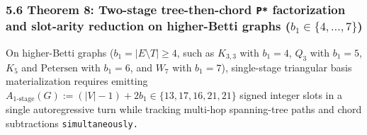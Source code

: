 \documentclass[
  11pt,
]{article}
\begin{document}
\subsubsection{\texorpdfstring{5.6 Theorem 8: Two-stage tree-then-chord
\texttt{P*} factorization and slot-arity reduction on higher-Betti
graphs
(\(b_1 \in \{4,\allowbreak  \dots,\allowbreak  7\}\))}{5.6 Theorem 8: Two-stage tree-then-chord P* factorization and slot-arity reduction on higher-Betti graphs (b\_1 \textbackslash in \textbackslash\{4,\textbackslash allowbreak  \textbackslash dots,\textbackslash allowbreak  7\textbackslash\})}}\label{theorem-8-two-stage-tree-then-chord-p-factorization-and-slot-arity-reduction-on-higher-betti-graphs-b_1-in-4-dots-7}

On higher-Betti graphs (\(b_1 = |E \setminus T| \ge 4\), such as
\(K_{3,\allowbreak 3}\) with \(b_1 = 4\), \(Q_3\) with \(b_1 = 5\),
\(K_5\) and \(\text{Petersen}\) with \(b_1 = 6\), and \(W_7\) with
\(b_1 = 7\)), single-stage triangular basis materialization requires
emitting
\(A_{\text{1-stage}}(G) := (|V| - 1) + 2 b_1 \in \{13,\allowbreak  17,\allowbreak  16,\allowbreak  21,\allowbreak  21\}\)
signed integer slots in a single autoregressive turn while tracking
multi-hop spanning-tree paths and chord subtractions
\nolinkurl{simultaneously.}
\end{document}
